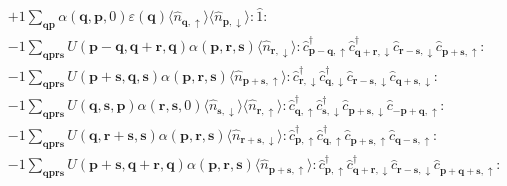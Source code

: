 \begin{align*}
	&+1 \sum_{ \mathbf{q} \mathbf{p} } \alpha( \mathbf{q}, \mathbf{p}, 0 )  \varepsilon( \mathbf{q} )   \langle \hat{n}_{ \mathbf{q}, \uparrow } \rangle \langle \hat{n}_{ \mathbf{p}, \downarrow } \rangle : \hat{1} : \\
	&-1 \sum_{ \mathbf{q} \mathbf{p} \mathbf{r} \mathbf{s} } U( \mathbf{p}-\mathbf{q}, \mathbf{q}+\mathbf{r}, \mathbf{q} )  \alpha( \mathbf{p}, \mathbf{r}, \mathbf{s} )   \langle \hat{n}_{ \mathbf{r}, \downarrow } \rangle :\hat{c}_{ \mathbf{p}-\mathbf{q}, \uparrow }^\dagger \hat{c}_{ \mathbf{q}+\mathbf{r}, \downarrow }^\dagger \hat{c}_{ \mathbf{r}-\mathbf{s}, \downarrow }^{\phantom{\dagger}}\hat{c}_{ \mathbf{p}+\mathbf{s}, \uparrow }^{\phantom{\dagger}}: \\
	&-1 \sum_{ \mathbf{q} \mathbf{p} \mathbf{r} \mathbf{s} } U( \mathbf{p}+\mathbf{s}, \mathbf{q}, \mathbf{s} )  \alpha( \mathbf{p}, \mathbf{r}, \mathbf{s} )   \langle \hat{n}_{ \mathbf{p}+\mathbf{s}, \uparrow } \rangle :\hat{c}_{ \mathbf{r}, \downarrow }^\dagger \hat{c}_{ \mathbf{q}, \downarrow }^\dagger \hat{c}_{ \mathbf{r}-\mathbf{s}, \downarrow }^{\phantom{\dagger}}\hat{c}_{ \mathbf{q}+\mathbf{s}, \downarrow }^{\phantom{\dagger}}: \\
	&-1 \sum_{ \mathbf{q} \mathbf{p} \mathbf{r} \mathbf{s} } U( \mathbf{q}, \mathbf{s}, \mathbf{p} )  \alpha( \mathbf{r}, \mathbf{s}, 0 )   \langle \hat{n}_{ \mathbf{s}, \downarrow } \rangle \langle \hat{n}_{ \mathbf{r}, \uparrow } \rangle :\hat{c}_{ \mathbf{q}, \uparrow }^\dagger \hat{c}_{ \mathbf{s}, \downarrow }^\dagger \hat{c}_{ \mathbf{p}+\mathbf{s}, \downarrow }^{\phantom{\dagger}}\hat{c}_{ -\mathbf{p}+\mathbf{q}, \uparrow }^{\phantom{\dagger}}: \\
	&-1 \sum_{ \mathbf{q} \mathbf{p} \mathbf{r} \mathbf{s} } U( \mathbf{q}, \mathbf{r}+\mathbf{s}, \mathbf{s} )  \alpha( \mathbf{p}, \mathbf{r}, \mathbf{s} )   \langle \hat{n}_{ \mathbf{r}+\mathbf{s}, \downarrow } \rangle :\hat{c}_{ \mathbf{p}, \uparrow }^\dagger \hat{c}_{ \mathbf{q}, \uparrow }^\dagger \hat{c}_{ \mathbf{p}+\mathbf{s}, \uparrow }^{\phantom{\dagger}}\hat{c}_{ \mathbf{q}-\mathbf{s}, \uparrow }^{\phantom{\dagger}}: \\
	&-1 \sum_{ \mathbf{q} \mathbf{p} \mathbf{r} \mathbf{s} } U( \mathbf{p}+\mathbf{s}, \mathbf{q}+\mathbf{r}, \mathbf{q} )  \alpha( \mathbf{p}, \mathbf{r}, \mathbf{s} )   \langle \hat{n}_{ \mathbf{p}+\mathbf{s}, \uparrow } \rangle :\hat{c}_{ \mathbf{p}, \uparrow }^\dagger \hat{c}_{ \mathbf{q}+\mathbf{r}, \downarrow }^\dagger \hat{c}_{ \mathbf{r}-\mathbf{s}, \downarrow }^{\phantom{\dagger}}\hat{c}_{ \mathbf{p}+\mathbf{q}+\mathbf{s}, \uparrow }^{\phantom{\dagger}}: \\

\end{align*}
